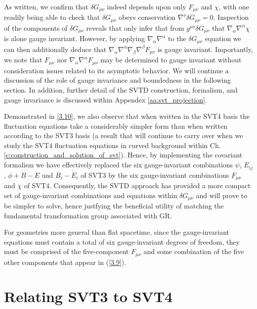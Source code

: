 As written, we confirm that $\delta G_{\mu\nu}$ indeed depends upon only $F_{\mu\nu}$ and $\chi$, with one readily being able to check that $\delta G_{\mu\nu}$ obeys conservation $\nabla^{\nu}\delta G_{\mu\nu}=0$. Inspection of the components of $\delta G_{\mu\nu}$ reveals that only infer that from $g^{\mu\nu}\delta G_{\mu\nu}$ that $\nabla_{\alpha}\nabla^{\alpha}\chi$ is alone gauge invariant. However, by applying $\nabla_{\alpha}\nabla^{\alpha}$ to the $\delta G_{\mu\nu}$ equation we can then additionally deduce that $\nabla_{\alpha}\nabla^{\alpha}\nabla_{\beta}\nabla^{\beta}F_{\mu\nu}$ is gauge invariant. Importantly, we note that $F_{\mu\nu}$ nor $\nabla_\alpha\nabla^\alpha F_{\mu\nu}$ may be determined to gauge invariant without consideration issues related to its asymptotic behavior.  We will continue a discussion of the role of gauge invariance and boundedness in the following section. In addition, further detail of the SVTD construction, formalism, and gauge invariance is discussed within Appendex \ref{aa:svt_projection}. 

Demonstrated in \eqref{3.10}, we also observe that when written in the SVT4 basis the fluctuation equations take a considerably simpler form than when written according to the SVT3 basis (a result that will continue to carry over when we study the SVT4 fluctuation equations in curved background within Ch. \ref{c:construction_and_solution_of_svt}). Hence, by implementing the covariant formalism we have effectively replaced the six gauge-invariant combinations $\psi$, $E_{ij}$,  $\phi+\dot{B}-\ddot{E}$ and $B_i-\dot{E}_i$ of SVT3 by the six gauge-invariant combinations $F_{\mu\nu}$ and $\chi$ of SVT4. Consequently, the SVTD approach has provided a more compact set of gauge-invariant combinations and equations within $\delta G_{\mu\nu}$ and will prove to be simpler to solve, hence justfying the beneficial utility of matching the fundamental transformation group associated with GR.

For geometries more general than flat spacetime, since the gauge-invariant equations must contain a total of six gauge-invariant degrees of freedom, they must be comprised of the five-component $F_{\mu\nu}$ and some combination of the five other components that appear in (\ref{3.9}).


\section{Relating SVT3 to SVT4}
\label{s:relating_svt3_to_svt4}

